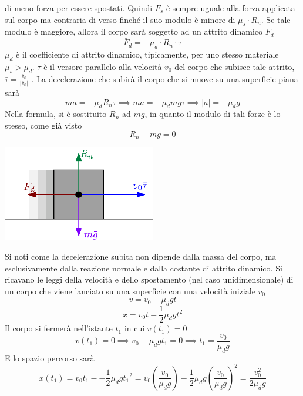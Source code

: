 \documentclass[10pt, letterpaper]{report}
\begin{document}
 di meno forza per essere spostati.\acc 
 Quindi $F_s$ è sempre uguale alla forza applicata sul corpo ma contraria di verso finché il suo modulo è minore 
 di $\mu_s\cdot R_n$. Se tale modulo è maggiore, allora il corpo sarà soggetto ad un 
 attrito dinamico $\bar F_d$
 $$ \bar F_d = -\mu_d\cdot R_n\cdot \bar \tau$$
$\mu_d$ è il coefficiente di attrito dinamico, tipicamente, per uno stesso materiale $\mu_s>\mu_d$. $\bar \tau$ è il 
versore parallelo  alla velocità $\bar v_0$ del corpo che subisce tale attrito, $\bar \tau = \frac{\bar v_0}{|\bar v_0|}$ . La decelerazione che subirà 
il corpo che si muove su una superficie piana sarà
$$ m\bar a = -\mu_dR_n\bar \tau\implies m\bar a = -\mu_dmg\bar \tau \implies |\bar a| = -\mu_d g$$
Nella formula, si è sostituito $R_n$ ad $mg$, in quanto il modulo di tali forze è lo stesso, come già visto 
$$ R_n-mg=0$$
\begin{center}
    \includegraphics[width=0.5\textwidth]{images/attritoDinamico.eps}
\end{center}
Si noti come la decelerazione subita non dipende dalla massa del corpo, ma esclusivamente dalla reazione 
normale e dalla costante di attrito dinamico. Si ricavano le leggi della velocità e dello spostamento (nel caso 
unidimensionale) di un corpo che viene lanciato su una superficie con una velocità iniziale $v_0$
$$ v=v_0-\mu_dgt$$ 
$$ x=v_0t-\frac{1}{2}\mu_dgt^2$$
Il corpo si fermerà nell'istante $t_1$ in cui $v(t_1)=0$
$$ v(t_1)=0\implies v_0-\mu_dgt_1=0\implies t_1=\frac{v_0}{\mu_dg}$$
E lo spazio percorso sarà 
$$ x(t_1)=v_0t_1--\frac{1}{2}\mu_dg{t_1}^2=
v_0(\frac{v_0}{\mu_dg})-\frac{1}{2}\mu_dg{(\frac{v_0}{\mu_dg})}^2=\frac{v_0^2}{2\mu_dg}
$$
\end{document}

